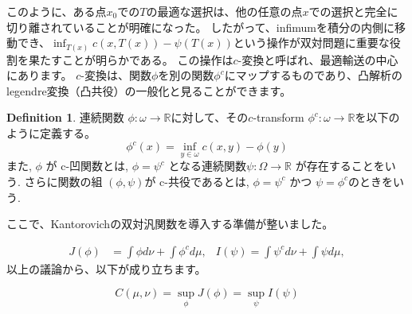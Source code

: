 \documentclass{jsarticle}
\theoremstyle{definition}
\newtheorem{dfn}{Definition}[section]
\begin{document}
このように、ある点$x_0$での$T$の最適な選択は、他の任意の点$x$での選択と完全に切り離されていることが明確になった。
したがって、infimumを積分の内側に移動でき、$\inf_{T(x)} c(x,T(x)) - \psi (T(x))$という操作が双対問題に重要な役割を果たすことが明らかである。
この操作は$c$-変換と呼ばれ、最適輸送の中心にあります。
$c$-変換は、関数$\phi$を別の関数$\phi^c$にマップするものであり、凸解析のlegendre変換（凸共役）の一般化と見ることができます。

\begin{dfn}
  \label{dfn:c-transform}
  連続関数 $\phi: \omega \to \mathbb{R}$に対して、その$c$-transform $\phi^c: \omega \to \mathbb{R}$を以下のように定義する。
  \begin{equation*}
    \phi^c(x) = \inf_{y \in \omega} c(x, y) - \phi(y)
  \end{equation*}
  また, $\phi$ が c-凹関数とは, $\phi = \psi^c$ となる連続関数$\psi: \Omega \to \mathbb{R}$ が存在することをいう.
  さらに関数の組 $(\phi, \psi)$が c-共役であるとは, $\phi = \psi^c$ かつ $\psi = \phi^c$のときをいう.
\end{dfn}


ここで、Kantorovichの双対汎関数を導入する準備が整いました。

\begin{align*}
  J(\phi) &= \int \phi  d \nu + \int \phi^c  d \mu, &
  I(\psi) = \int \psi^c  d \nu + \int \psi  d \mu, 
\end{align*}
以上の議論から、以下が成り立ちます。

\begin{equation*}
  C(\mu, \nu) = \sup_\phi J(\phi) = \sup_\psi I(\psi)
\end{equation*}
\end{document}
